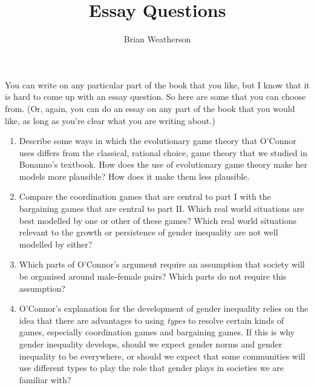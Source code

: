 \documentclass[
  11pt,
]{article}
\title{Essay Questions}
\author{Brian Weatherson}
\date{}
\providecommand{\tightlist}{%
  \setlength{\itemsep}{0pt}\setlength{\parskip}{0pt}}
\begin{document}
\maketitle

You can write on any particular part of the book that you like, but I
know that it is hard to come up with an essay question. So here are some
that you can choose from. (Or, again, you can do an essay on any part of
the book that you would like, as long as you're clear what you are
writing about.)

\begin{enumerate}
\def\labelenumi{\arabic{enumi}.}
\tightlist
\item
  Describe some ways in which the evolutionary game theory that O'Connor
  uses differs from the classical, rational choice, game theory that we
  studied in Bonanno's textbook. How does the use of evolutionary game
  theory make her models more plausible? How does it make them less
  plausible.
\item
  Compare the coordination games that are central to part I with the
  bargaining games that are central to part II. Which real world
  situations are best modelled by one or other of these games? Which
  real world situations relevant to the growth or persistence of gender
  inequality are not well modelled by either?
\item
  Which parts of O'Connor's argument require an assumption that society
  will be organised around male-female pairs? Which parts do not require
  this assumption?
\item
  O'Connor's explanation for the development of gender inequality relies
  on the idea that there are advantages to using \emph{types} to resolve
  certain kinds of games, especially coordination games and bargaining
  games. If this is why gender inequality develops, should we expect
  gender norms and gender inequality to be everywhere, or should we
  expect that some communities will use different types to play the role
  that gender plays in societies we are familiar with?
\end{enumerate}
\end{document}
